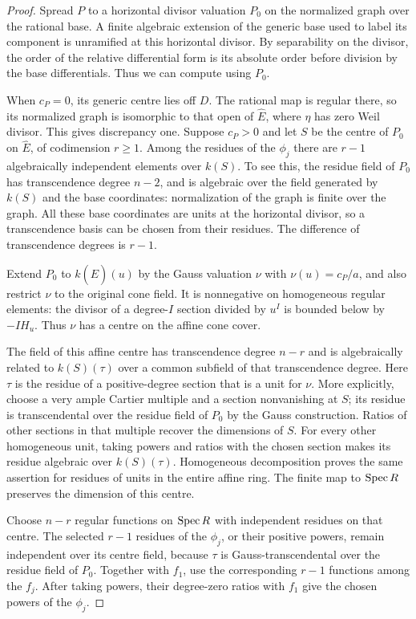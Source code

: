 \begin{proof}
Spread $P$ to a horizontal divisor valuation $P_0$ on the normalized
graph over the rational base.  A finite algebraic extension of the
generic base used to label its component is unramified at this
horizontal divisor.  By separability on the divisor, the order of the
relative differential form is its absolute order before division by
the base differentials.  Thus we can compute using $P_0$.

When $c_P=0$, its generic centre lies off $D$.  The rational map is
regular there, so its normalized graph is isomorphic to that open of
$\widehat E$, where $\eta$ has zero Weil divisor.  This gives discrepancy
one.  Suppose $c_P>0$ and let $S$ be
the centre of $P_0$ on $\widehat E$, of codimension $r\geq1$.
Among the residues of the $\phi_j$ there are $r-1$ algebraically
independent elements over $k(S)$.  To see this, the residue field of
$P_0$ has transcendence degree $n-2$, and is algebraic over the field
generated by $k(S)$ and the base coordinates: normalization of the
graph is finite over the graph.  All these base coordinates are units
at the horizontal divisor, so a transcendence basis can be chosen from
their residues.  The difference of transcendence degrees is $r-1$.

Extend $P_0$ to $k(\widehat E)(u)$ by the Gauss valuation $\nu$ with
$\nu(u)=c_P/a$, and also restrict $\nu$ to the original cone field.
It is nonnegative on homogeneous regular elements: the divisor of a
degree-$I$ section divided by $u^I$ is bounded below by $-IH_u$.
Thus $\nu$ has a centre on the affine cone cover.

The field of this affine centre has transcendence degree $n-r$ and is
algebraically related to $k(S)(\tau)$ over a common subfield of that
transcendence degree.  Here $\tau$ is the residue of a positive-degree
section that is a unit for $\nu$.  More explicitly, choose a very ample
Cartier multiple and a section nonvanishing at $S$; its residue is
transcendental over the residue field of $P_0$ by the Gauss construction.
Ratios of other sections in that multiple recover the dimensions of
$S$.  For every other homogeneous unit, taking powers and ratios with
the chosen section makes its residue algebraic over $k(S)(\tau)$.
Homogeneous decomposition proves the same assertion for residues of
units in the entire affine ring.  The finite map to $\operatorname{Spec} R$ preserves
the dimension of this centre.

Choose $n-r$ regular functions on $\operatorname{Spec} R$ with independent residues
on that centre.  The selected $r-1$ residues of the $\phi_j$, or their
positive powers, remain independent over its centre field, because
$\tau$ is Gauss-transcendental over the residue field of $P_0$.
Together with $f_1$, use the corresponding $r-1$ functions among the
$f_j$.  After taking powers, their degree-zero ratios with $f_1$ give
the chosen powers of the $\phi_j$.


\end{proof}
